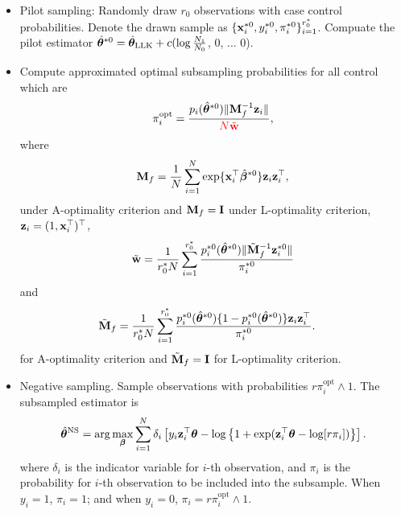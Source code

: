 \documentclass[letterpaper,12pt,hidelinks]{article}
\begin{document}
\begin{itemize}
    \item Pilot sampling: Randomly draw $r_0$ observations with case control 
    probabilities. Denote the drawn sample as 
    $\{\mathbf{x}_i^{*0}, y_i^{*0}, \pi_i^{*0}\}_{i=1}^{r_0^*}$. Compuate the pilot 
    estimator 
    ${\hat{\boldsymbol{\theta}}}^{*0} = {\hat{\boldsymbol{\theta}}}_{\mathrm{LLK}} + c(\log\frac{N_1}{N_0}$, 0, ... 0).
    \item Compute approximated optimal subsampling probabilities for all 
    control which are 
    \begin{align*}
        \pi_i^{\mathrm{opt}} = \frac{p_i({\hat{\boldsymbol{\theta}}}^{*0})\|\mathbf{M}_f^{-1} \mathbf{z}_i\|}{\color{red} N\tilde{\mathbf{w}}},
    \end{align*}
    where 
    \begin{align*}
        \mathbf{M}_f = \frac{1}{N}\sum_{i=1}^{N} \exp\{ \mathbf{x}_i^{\top} \hat{\boldsymbol{\beta}}^{*0}\} \mathbf{z}_i\mathbf{z}_i^{\top},
    \end{align*}
    under A-optimality criterion and $\mathbf{M}_f = \mathbf{I}$ under L-optimality criterion, 
$\mathbf{z}_i = (1, \mathbf{x}_i^{\top})^{\top}$,  
\begin{align*}
    \tilde{\mathbf{w}} = \frac{1}{r_0^* N} \sum_{i=1}^{r_0^{*}} \frac{p^{*0}_i({\hat{\boldsymbol{\theta}}}^{*0})\|\tilde{\mathbf{M}}_f^{-1} \mathbf{z}^{*0}_i\|}{\pi_i^{*0}}
\end{align*}
and 
\begin{align*}
    \tilde{\mathbf{M}}_f &= \frac{1}{r_0^* N} \sum_{i=1}^{r_0^*} \frac{p_i^{*0}({\hat{\boldsymbol{\theta}}}^{*0})\{1 - p_i^{*0}({\hat{\boldsymbol{\theta}}}^{*0})\} \mathbf{z}_i\mathbf{z}_i^{\top}}{\pi_i^{*0}}.
\end{align*}
for A-optimality criterion and $\tilde{\mathbf{M}}_f = \mathbf{I}$ for L-optimality criterion.
\item Negative sampling. Sample observations with probabilities 
$r \pi_i^{\mathrm{opt}} \wedge 1$. The subsampled estimator is 
\begin{align*}
    {\hat{\boldsymbol{\theta}}}^{\mathrm{NS}} = \arg\max_{\boldsymbol{\beta}} \sum_{i=1}^{N} \delta_i 
    \left[y_i \mathbf{z}_i^{\top} \boldsymbol{\theta} - \log\left\{ 1 + \exp(\mathbf{z}_i^{\top} \boldsymbol{\theta} - \log [r \pi_i]) \right\}\right].
\end{align*}
where $\delta_i$ is the indicator variable for $i$-th observation, and 
$\pi_i$ is the probability for $i$-th observation to be included into 
the subsample. When $y_i = 1$, $\pi_i = 1$; and 
when $y_i = 0$, $\pi_i = r\pi_i^{\mathrm{opt}} \wedge 1$.
\end{itemize}
\end{document}

